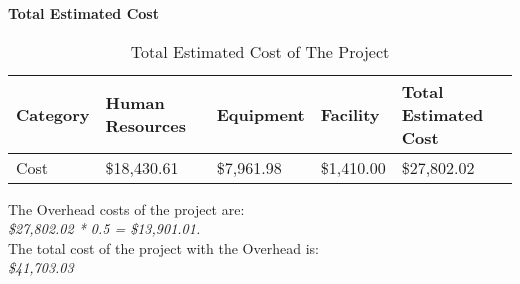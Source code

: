 \begin{table}[H]
    \centering
    \textbf{Total Estimated Cost}
    \begin{tabular}{||m{}|m{}|m{}|m{}|m{}||}
        \hline 
        \rowcolor{cyan}
        Category & Human Resources & Equipment & Facility & Total Estimated Cost\\
        \hline
        \rowcolor{teal}
        Cost & \$18,430.61 & \$7,961.98 & \$1,410.00 & \$27,802.02\\
        \hline
    \end{tabular}
    \caption {Total Estimated Cost of The Project}
       \label{table:6}
\end{table}
The Overhead costs of the project are:\\
\textit{\$27,802.02 * 0.5 = \$13,901.01.}\\
The total cost of the project with the Overhead is:\\
\textit{\$41,703.03}